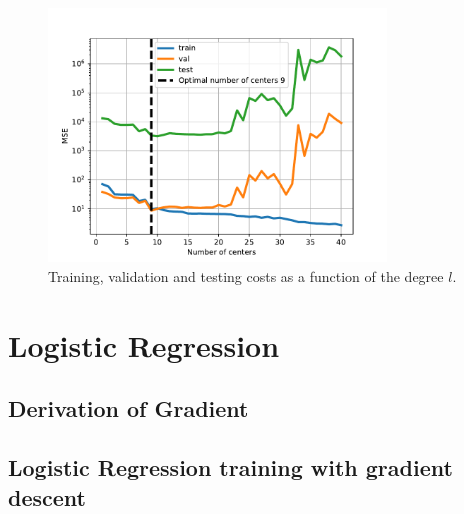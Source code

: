 \documentclass{article}
\begin{document}
\begin{figure}[!ht]
\centering
\includegraphics[width=0.8\textwidth]{./Figures/linreg_rbf4_errors.pdf}
\caption{Training, validation and testing costs as a function of the degree $l$.}
\label{linreg_rbf4}
\end{figure}


\section{Logistic Regression}
\subsection{Derivation of Gradient}


\subsection{Logistic Regression training with gradient descent}
\end{document}
